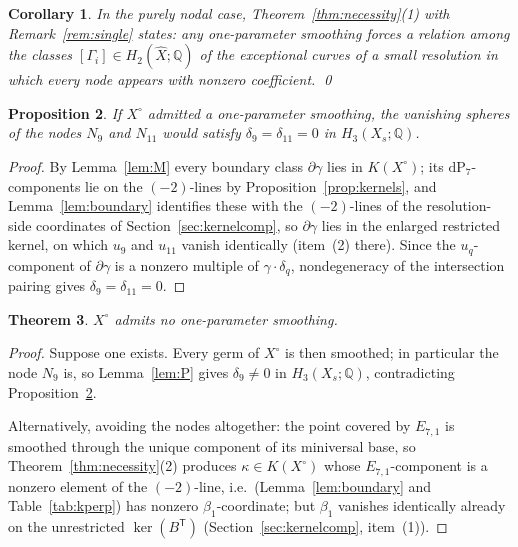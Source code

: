 \documentclass[11pt]{amsart}
\newtheorem{theorem}{Theorem}[section]
\newtheorem{proposition}[theorem]{Proposition}
\newtheorem{corollary}[theorem]{Corollary}
\theoremstyle{definition}
\theoremstyle{remark}
\theoremstyle{plain}
\newcommand{\QQ}{\mathbb{Q}}
\newcommand{\dP}{\mathrm{dP}}
\newcommand{\Xh}{\widehat{X}}
\begin{document}
\begin{corollary}\label{cor:friedman}
In the purely nodal case, Theorem~\ref{thm:necessity}(1) with
Remark~\ref{rem:single} states: any one-parameter smoothing forces a
relation among the classes $[\Gamma_i]\in H_2(\Xh;\QQ)$ of the
exceptional curves of a small resolution in which every node appears
with nonzero coefficient.  \qed
\end{corollary}

\begin{proposition}\label{prop:coloops}
If $X^{\circ}$ admitted a one-parameter smoothing, the vanishing
spheres of the nodes $N_9$ and $N_{11}$ would satisfy
$\delta_9=\delta_{11}=0$ in $H_3(X_s;\QQ)$.
\end{proposition}

\begin{proof}
By Lemma~\ref{lem:M} every boundary class
$\partial\gamma$ lies in $K(X^{\circ})$; its $\dP_7$-components lie
on the $(-2)$-lines by Proposition~\ref{prop:kernels}, and
Lemma~\ref{lem:boundary} identifies these with the $(-2)$-lines of
the resolution-side coordinates of Section~\ref{sec:kernelcomp}, so
$\partial\gamma$ lies in the enlarged restricted kernel, on which
$u_9$ and $u_{11}$ vanish identically (item~(2) there).  Since the $u_q$-component of $\partial\gamma$ is a
nonzero multiple of $\gamma\cdot\delta_q$, nondegeneracy of the
intersection pairing gives $\delta_9=\delta_{11}=0$.
\end{proof}

\begin{theorem}\label{thm:main}
$X^{\circ}$ admits no one-parameter smoothing.
\end{theorem}

\begin{proof}
Suppose one exists.  Every germ of $X^{\circ}$ is then smoothed; in
particular the node $N_9$ is, so Lemma~\ref{lem:P} gives
$\delta_9\neq0$ in $H_3(X_s;\QQ)$, contradicting
Proposition~\ref{prop:coloops}.

Alternatively, avoiding the nodes altogether: the point covered by
$E_{7,1}$ is smoothed through the unique component of its miniversal
base, so Theorem~\ref{thm:necessity}(2) produces
$\kappa\in K(X^{\circ})$ whose $E_{7,1}$-component is a nonzero
element of the $(-2)$-line, i.e.\ (Lemma~\ref{lem:boundary} and
Table~\ref{tab:kperp}) has nonzero $\beta_1$-coordinate; but
$\beta_1$ vanishes identically already on the unrestricted
$\ker(B^{\mathsf T})$ (Section~\ref{sec:kernelcomp}, item~(1)).
\end{proof}
\end{document}
